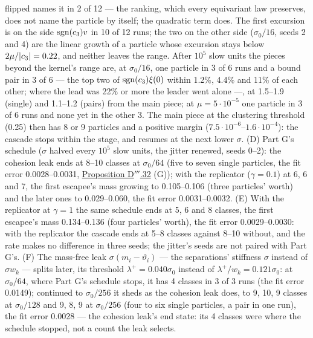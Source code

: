 \begin{sloppypar}
flipped names it in 2 of 12 --- the ranking, which every equivariant law preserves, does not name the particle by
itself; the quadratic term does. The first excursion is on the side $\operatorname{sgn}(c_3)v$ in 10 of 12 runs; the two on the
other side ($\sigma_0/16$, seeds 2 and 4) are the linear growth of a particle whose excursion stays below
$2\mu/\lvert c_3\rvert = 0.22$, and neither leaves the range. After $10^5$ slow units the pieces beyond the kernel's range
are, at $\sigma_0/16$, one particle in 3 of 6 runs and a bound pair in 3 of 6 --- the top two of $\operatorname{sgn}(c_3)\xi(0)$
within 1.2\%, 4.4\% and 11\% of each other; where the lead was 22\% or more the leader went alone ---, at 1.5--1.9
(single) and 1.1--1.2 (pairs) from the main piece; at $\mu = 5\cdot10^{-5}$ one particle in 3 of 6 runs and none yet in
the other 3. The main piece at the clustering threshold (0.25) then has 8 or 9 particles and a positive margin
($7.5\cdot10^{-6}$--$1.6\cdot10^{-4}$): the cascade stops within the stage, and resumes at the next lower $\sigma$.
(D) Part G's schedule ($\sigma$ halved every $10^5$ slow units, the jitter renewed, seeds 0--2): the cohesion leak ends
at 8--10 classes at $\sigma_0/64$ (five to seven single particles, the fit error 0.0028--0.0031,
\hyperref[res:thmDppp:32]{Proposition D$'''$.32} (G)); with the replicator ($\gamma = 0.1$) at 6, 6 and 7, the first
escapee's mass growing to 0.105--0.106 (three particles' worth) and the later ones to 0.029--0.060, the fit error
0.0031--0.0032. (E) With the replicator at $\gamma = 1$ the same schedule ends at 5, 6 and 8 classes, the first
escapee's mass 0.134--0.136 (four particles' worth), the fit error 0.0029--0.0030: with the replicator the cascade ends
at 5--8 classes against 8--10 without, and the rate makes no difference in three seeds; the jitter's seeds are not
paired with Part G's. (F) The mass-free leak $\sigma(m_i - \vartheta_i)$ --- the separations' stiffness $\sigma$
instead of $\sigma w_k$ --- splits later, its threshold $\lambda^+ = 0.040\sigma_0$ instead of
$\lambda^+/w_k = 0.121\sigma_0$: at $\sigma_0/64$, where Part G's schedule stops, it has 4 classes in 3 of 3 runs (the
fit error 0.0149); continued to $\sigma_0/256$ it sheds as the cohesion leak does, to 9, 10, 9 classes at
$\sigma_0/128$ and 9, 8, 9 at $\sigma_0/256$ (four to six single particles, a pair in one run), the fit error 0.0028
--- the cohesion leak's end state: its 4 classes were where the schedule stopped, not a count the leak selects.
\end{sloppypar}

